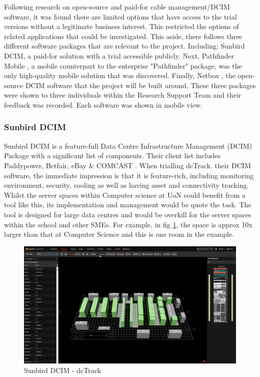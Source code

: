 \documentclass [11pt,a4paper]{article}
\begin{document}
Following research on open-source and paid-for cable management/DCIM software, it was found there are limited options that have access to the trial versions without a legitimate business interest. This restricted the options of related applications that could be investigated. This aside, there follows three different software packages that are relevant to the project. Including; Sunbird DCIM\cite{Sunbird}, a paid-for solution with a trial accessible publicly. Next, Pathfinder Mobile \cite{Pathfinder}, a mobile counterpart to the enterprise "Pathfinder" package, was the only high-quality mobile solution that was discovered. Finally, Netbox \cite{Netbox}, the open-source DCIM software that the project will be built around. These three packages were shown to three individuals within the Research Support Team and their feedback was recorded. Each software was shown in mobile view. 

\subsubsection{Sunbird DCIM}
\label{sec:sunbird}
Sunbird DCIM is a feature-full Data Centre Infrastructure Management (DCIM) Package with a significant list of components. Their client list includes Paddypower, Betfair, eBay \& COMCAST \cite{Sunbird-we-know-data-centres}. When trialling dcTrack. their DCIM software, the immediate impression is that it is feature-rich, including monitoring environment, security, cooling as well as having asset and connectivity tracking. Whilst the server spaces within Computer science at UoN could benefit from a tool like this, its implementation and management would be quote the task. The tool is designed for large data centres and would be overkill for the server spaces within the school and other SMEs. For example, in fig \ref{fig:sunbird_dcTrack}, the space is approx 10x larger than that at Computer Science and this is one room in the example. 

\begin{figure}[H]
    \centering
    \includegraphics[width=0.8\linewidth]{images/sunbirddcim.png}
    \caption{Sunbird DCIM - dcTrack}
    \label{fig:sunbird_dcTrack}
\end{figure}
\end{document}
